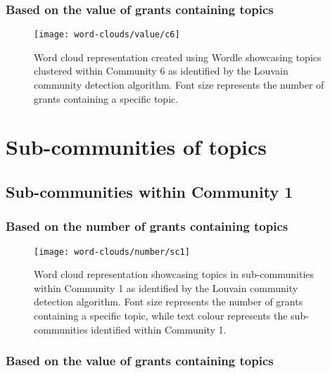 \clearpage

\subsubsection{Based on the value of grants containing topics}

\begin{figure}[htbp]
    \centering
    \texttt{[image: word-clouds/value/c6]}
    \caption[Word cloud representation based on the value of grants containing topics clustered within Community 6]{Word cloud representation created using Wordle showcasing topics clustered within Community 6 as identified by the Louvain community detection algorithm. Font size represents the number of grants containing a specific topic.}
    \label{fig:topic_grant_value_c6}
\end{figure}

\section{Sub-communities of topics}

\subsection{Sub-communities within Community 1}

\subsubsection{Based on the number of grants containing topics}

\begin{figure}[htbp]
    \centering
    \texttt{[image: word-clouds/number/sc1]}
    \caption[Word cloud representation based on the number of grants containing topics in sub-communities within Community 1]{Word cloud representation showcasing topics in sub-communities within Community 1 as identified by the Louvain community detection algorithm. Font size represents the number of grants containing a specific topic, while text colour represents the sub-communities identified within Community 1.}
    \label{fig:topic_grant_number_sc1}
\end{figure}

\clearpage

\subsubsection{Based on the value of grants containing topics}

